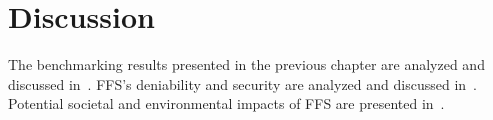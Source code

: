 
\chapter{Discussion}
\label{ch:discussion}
The benchmarking results presented in the previous chapter are analyzed and discussed in~. \gls{FFS}'s deniability and security are analyzed and discussed in~. Potential societal and environmental impacts of \gls{FFS} are presented in~.




